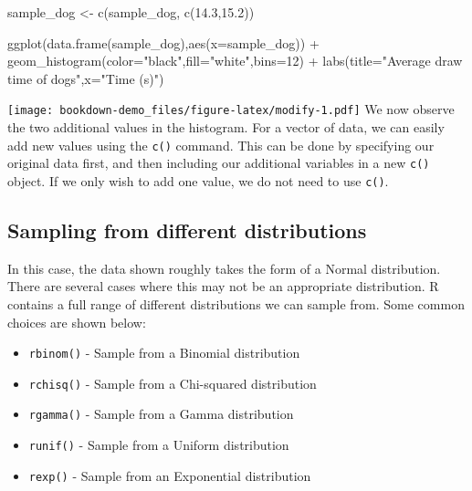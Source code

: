 \documentclass[
]{book}
\newenvironment{Shaded}{\begin{snugshade}}{\end{snugshade}}
\newcommand{\AttributeTok}[1]{\textcolor[rgb]{0.77,0.63,0.00}{#1}}
\newcommand{\DecValTok}[1]{\textcolor[rgb]{0.00,0.00,0.81}{#1}}
\newcommand{\FloatTok}[1]{\textcolor[rgb]{0.00,0.00,0.81}{#1}}
\newcommand{\FunctionTok}[1]{\textcolor[rgb]{0.00,0.00,0.00}{#1}}
\newcommand{\NormalTok}[1]{#1}
\newcommand{\OtherTok}[1]{\textcolor[rgb]{0.56,0.35,0.01}{#1}}
\newcommand{\SpecialCharTok}[1]{\textcolor[rgb]{0.00,0.00,0.00}{#1}}
\newcommand{\StringTok}[1]{\textcolor[rgb]{0.31,0.60,0.02}{#1}}
\providecommand{\tightlist}{%
  \setlength{\itemsep}{0pt}\setlength{\parskip}{0pt}}
\begin{document}
\begin{Shaded}
\begin{Highlighting}[]
\NormalTok{sample\_dog }\OtherTok{\textless{}{-}} \FunctionTok{c}\NormalTok{(sample\_dog, }\FunctionTok{c}\NormalTok{(}\FloatTok{14.3}\NormalTok{,}\FloatTok{15.2}\NormalTok{))}

\FunctionTok{ggplot}\NormalTok{(}\FunctionTok{data.frame}\NormalTok{(sample\_dog),}\FunctionTok{aes}\NormalTok{(}\AttributeTok{x=}\NormalTok{sample\_dog)) }\SpecialCharTok{+} \FunctionTok{geom\_histogram}\NormalTok{(}\AttributeTok{color=}\StringTok{"black"}\NormalTok{,}\AttributeTok{fill=}\StringTok{"white"}\NormalTok{,}\AttributeTok{bins=}\DecValTok{12}\NormalTok{) }\SpecialCharTok{+} 
            \FunctionTok{labs}\NormalTok{(}\AttributeTok{title=}\StringTok{"Average draw time of dogs"}\NormalTok{,}\AttributeTok{x=}\StringTok{"Time (s)"}\NormalTok{)}
\end{Highlighting}
\end{Shaded}

\texttt{[image: bookdown-demo\_files/figure-latex/modify-1.pdf]}
We now observe the two additional values in the histogram. For a vector of data, we can easily add new values using the \texttt{c()} command. This can be done by specifying our original data first, and then including our additional variables in a new \texttt{c()} object. If we only wish to add one value, we do not need to use \texttt{c()}.

\hypertarget{sampling-from-different-distributions}{%
\subsection{Sampling from different distributions}\label{sampling-from-different-distributions}}

In this case, the data shown roughly takes the form of a Normal distribution. There are several cases where this may not be an appropriate distribution. R contains a full range of different distributions we can sample from. Some common choices are shown below:

\begin{itemize}
\tightlist
\item
  \texttt{rbinom()} - Sample from a Binomial distribution
\item
  \texttt{rchisq()} - Sample from a Chi-squared distribution
\item
  \texttt{rgamma()} - Sample from a Gamma distribution
\item
  \texttt{runif()} - Sample from a Uniform distribution
\item
  \texttt{rexp()} - Sample from an Exponential distribution
\end{itemize}
\end{document}
